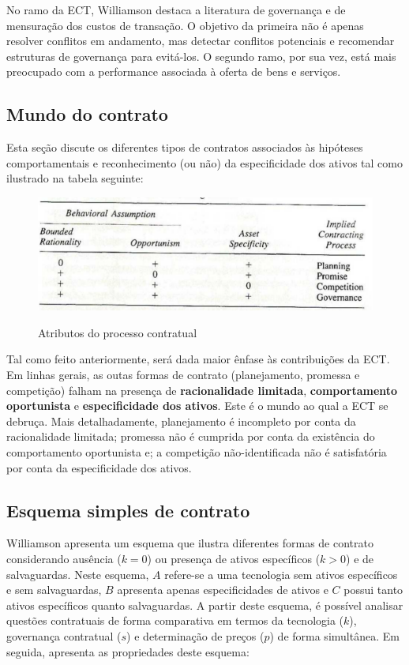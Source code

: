 No ramo da ECT, Williamson destaca a literatura de governança e de mensuração dos custos de transação. O objetivo da primeira não é apenas resolver conflitos em andamento, mas detectar conflitos potenciais e recomendar estruturas de governança para evitá-los. O segundo ramo, por sua vez, está mais preocupado com a performance associada à oferta de bens e serviços.


\subsection*{Mundo do contrato}

Esta seção discute os diferentes tipos de contratos associados às hipóteses comportamentais e reconhecimento (ou não) da especificidade dos ativos tal como ilustrado na tabela seguinte:

\begin{figure}[H]
	\centering
	\caption{Atributos do processo contratual}
	\includegraphics[width=0.7\linewidth]{screenshot002}
	\label{fig:screenshot002}
\end{figure}
Tal como feito anteriormente, será dada maior ênfase às contribuições da ECT.
Em linhas gerais, as outas formas de contrato (planejamento, promessa e competição) falham na presença de \textbf{racionalidade limitada}, \textbf{comportamento oportunista} e \textbf{especificidade dos ativos}. Este é o mundo ao qual a ECT se debruça. Mais detalhadamente, planejamento é incompleto por conta da racionalidade limitada; promessa não é cumprida por conta da existência do comportamento oportunista e; a competição não-identificada não é satisfatória por conta da especificidade dos ativos.

\subsection*{Esquema simples de contrato}

Williamson apresenta um esquema que ilustra diferentes formas de contrato considerando ausência ($k=0$) ou presença de ativos específicos ($k>0$) e de salvaguardas. Neste esquema, $A$ refere-se a uma tecnologia sem ativos específicos e sem salvaguardas, $B$ apresenta apenas especificidades de ativos e $C$ possui tanto ativos específicos quanto salvaguardas. A partir deste esquema, é possível analisar questões contratuais de forma comparativa em termos da tecnologia ($k$), governança contratual ($s$) e determinação de preços ($p$) de forma simultânea. Em seguida, apresenta as propriedades deste esquema:

